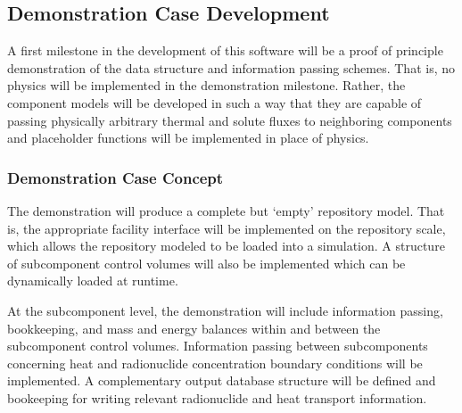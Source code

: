 \subsection{Demonstration Case Development}


A first milestone in the development of this software will be a  proof of 
principle demonstration of the data structure and information passing schemes.  
That is, no physics will be implemented in the demonstration milestone. Rather, 
the component models will be developed in such a way that they are capable of 
passing physically arbitrary thermal and solute fluxes to neighboring 
components and  placeholder functions will be implemented in place of physics.

\subsubsection{Demonstration Case Concept}





  The demonstration will produce a complete but `empty' repository model. That 
  is, the appropriate facility interface will be implemented on the repository 
  scale, which allows the repository modeled to be loaded into a \Cyclus 
  simulation. A structure of subcomponent control volumes will also be 
  implemented which can be dynamically loaded at runtime.




  At the subcomponent level, the demonstration will include information passing,
  bookkeeping, and mass and energy balances within and between the subcomponent 
  control volumes.  Information passing between subcomponents concerning heat 
  and radionuclide concentration boundary conditions will be implemented. A 
  complementary output database structure will be defined and bookeeping for 
  writing relevant radionuclide and heat transport information.  




